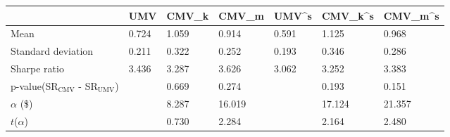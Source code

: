 \begin{tabular}{lllllll}
\toprule
 & UMV & CMV_k & CMV_m & UMV^s & CMV_k^s & CMV_m^s \\
\midrule
Mean & 0.724 & 1.059 & 0.914 & 0.591 & 1.125 & 0.968 \\
Standard deviation & 0.211 & 0.322 & 0.252 & 0.193 & 0.346 & 0.286 \\
Sharpe ratio & 3.436 & 3.287 & 3.626 & 3.062 & 3.252 & 3.383 \\
p-value(SR$_{\text{CMV}}$ - SR$_{\text{UMV}}$) &  & 0.669 & 0.274 &  & 0.193 & 0.151 \\
$\alpha$ (\$) &  & 8.287 & 16.019 &  & 17.124 & 21.357 \\
$t$($\alpha$) &  & 0.730 & 2.284 &  & 2.164 & 2.480 \\
\bottomrule
\end{tabular}
